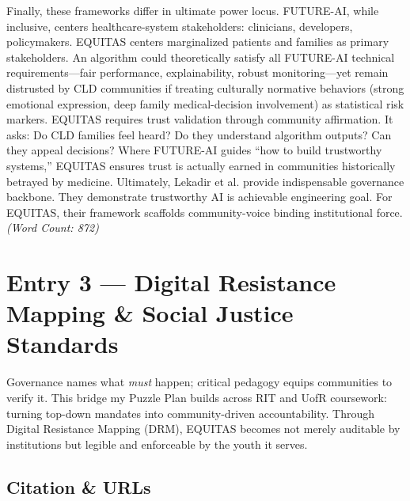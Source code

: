 \documentclass[11pt,twoside]{article}
\begin{document}
Finally, these frameworks differ in ultimate power locus. FUTURE-AI, while inclusive, centers healthcare-system stakeholders: clinicians, developers, policymakers. \textsc{EQUITAS} centers marginalized patients and families as primary stakeholders. An algorithm could theoretically satisfy all FUTURE-AI technical requirements---fair performance, explainability, robust monitoring---yet remain distrusted by CLD communities if treating culturally normative behaviors (strong emotional expression, deep family medical-decision involvement) as statistical risk markers. \textsc{EQUITAS} requires trust validation through community affirmation. It asks: Do CLD families feel heard? Do they understand algorithm outputs? Can they appeal decisions? Where FUTURE-AI guides ``how to build trustworthy systems,'' \textsc{EQUITAS} ensures trust is actually earned in communities historically betrayed by medicine. Ultimately, Lekadir et al. provide indispensable governance backbone. They demonstrate trustworthy AI is achievable engineering goal. For \textsc{EQUITAS}, their framework scaffolds community-voice binding institutional force. \textit{(Word Count: 872)}

\newpage


\setcounter{page}{12}

\section*{\label{entry3}Entry 3 --- Digital Resistance Mapping \& Social Justice Standards}

\vspace{-0.3cm}

Governance names what \emph{must} happen; critical pedagogy equips communities to verify it. This bridge my Puzzle Plan builds across RIT and UofR coursework: turning top-down mandates into community-driven accountability. Through Digital Resistance Mapping (DRM), \textsc{EQUITAS} becomes not merely auditable by institutions but legible and enforceable by the youth it serves.

\vspace{-0.3cm}

\subsection*{Citation \& URLs}

\vspace{-0.3cm}
\end{document}
